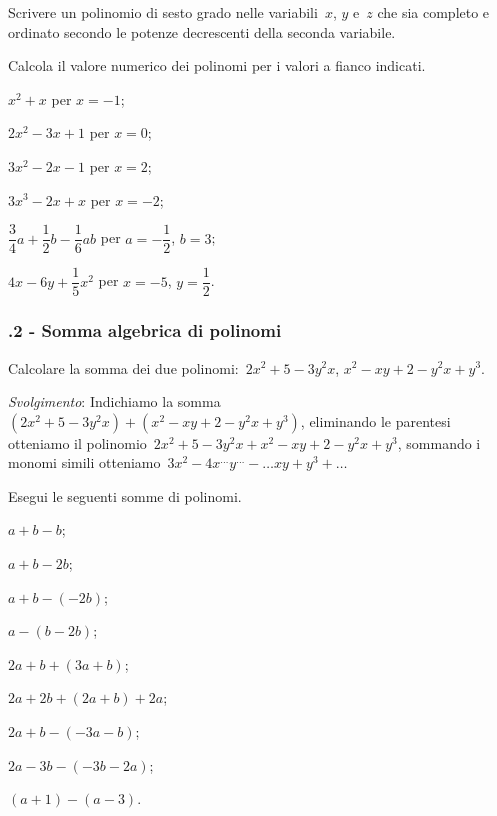 \begin{multicols}{2}
\begin{esercizio}
\label{ese:10.10}
Scrivere un polinomio di sesto grado nelle variabili~$x$, $y$ e~$z$ che sia completo e ordinato secondo le
potenze decrescenti della seconda variabile.
\end{esercizio}


\begin{esercizio}
\label{ese:10.11}
Calcola il valore numerico dei polinomi per i valori a fianco indicati.

\begin{enumeratea}
\item $x^2+x$ per $x=-1$;
\item $2x^2-3x+1$ per $x=0$;
\item $3x^2-2x-1$ per $x=2$;
\item $3x^3-2x+x$ per $x=-2$;
\item $\dfrac{3}{4}a+\dfrac{1}{2}b-\dfrac{1}{6}ab$ per $a=-\dfrac{1}{2}$, $b=3$;
\item $4x-6y+\dfrac{1}{5}x^2$ per $x=-5$, $y=\dfrac{1}{2}$.
\end{enumeratea}
\end{esercizio}
\end{multicols}


\subsubsection*{\thechapter.2 - Somma algebrica di polinomi}
\begin{esercizio}
\label{ese:10.12}
Calcolare la somma dei due polinomi:~$2x^2+5−3y^2x$, $x^2−xy+2−y^2x+y^3$.

\emph{Svolgimento}: Indichiamo la somma~$(2x^2+5−3y^2x)+(x^2−xy+2−y^2x+y^3)$, eliminando le parentesi otteniamo
il polinomio~$2x^2+5−3y^2x+x^2−xy+2−y^2x+y^3$, sommando i monomi simili otteniamo~$3x^2−4x^{\ldots}y^{\ldots}-\ldots xy+y^3+\ldots$
\end{esercizio}
\begin{esercizio}
\label{ese:10.13}
 Esegui le seguenti somme di polinomi.
 \begin{enumeratea}
 \item $a+b-b$;
 \item $a+b-2b$;
 \item $a+b-(-2b)$;
 \item $a-(b-2b)$;
 \item $2a+b+(3a+b)$;
 \item $2a+2b+(2a+b)+2a$;
 \item $2a+b-(-3a-b)$;
 \item $2a-3b-(-3b-2a)$;
 \item $(a+1)-(a-3)$.
\end{enumeratea}
\end{esercizio}


